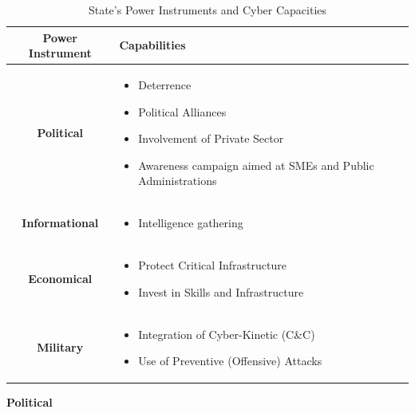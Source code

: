 \begin{table}[h]
    \centering
    \caption{State’s Power Instruments and Cyber Capacities}
    \label{tab:power-instruments}
    \begin{tabular}{|c|p{8cm}|}
        \hline
        Power Instrument & Capabilities \\
        \hline
        \textbf{Political} & 
        \begin{itemize}
            \item Deterrence
            \item Political Alliances
            \item Involvement of Private Sector
            \item Awareness campaign aimed at SMEs and Public Administrations
        \end{itemize} \\
        \hline
        \textbf{Informational} &  
        \begin{itemize}
        \item Intelligence gathering
        \end{itemize} \\
        \hline
        \textbf{Economical} & 
        \begin{itemize}
            \item Protect Critical Infrastructure
            \item Invest in Skills and Infrastructure
        \end{itemize} \\
        \hline
        \textbf{Military} & 
        \begin{itemize}
            \item Integration of Cyber-Kinetic (C\&C)
            \item Use of Preventive (Offensive) Attacks
        \end{itemize} \\
        \hline
    \end{tabular}
\end{table}



\textbf{Political}

